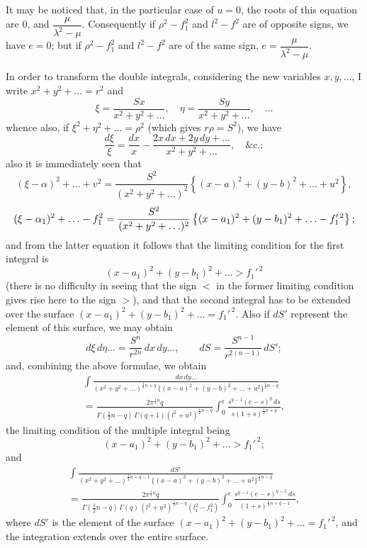 \documentclass[11pt,a4paper]{article}
\theoremstyle{plain}
\begin{document}
It may be noticed that, in the particular case of $u = 0$, the roots of this equation are $0$, and $\dfrac{\mu}{\lambda^2 - \mu}$. Consequently if $\rho^2 - f_1^2$ and $l^2 - f^2$ are of opposite signs, we have $e = 0$; but if $\rho^2 - f_1^2$ and $l^2 - f^2$ are of the same sign, $e = \dfrac{\mu}{\lambda^2 - \mu}$.

In order to transform the double integrals, considering the new variables $x, y, \ldots$, I write $x^2 + y^2 + \ldots = r^2$ and
\[\xi = \frac{S x}{x^2 + y^2 + \ldots}, \quad \eta = \frac{S y}{x^2 + y^2 + \ldots}, \quad \ldots\]
whence also, if $\xi^2 + \eta^2 + \ldots = \rho^2$ (which gives $r\rho = S^2$), we have
\[\frac{d\xi}{\xi} = \frac{dx}{x} - \frac{2x\,dx + 2y\,dy + \ldots}{x^2 + y^2 + \ldots}, \quad \&\text{c.};\]
also it is immediately seen that
\[(\xi - \alpha)^2 + \ldots + v^2 = \frac{S^2}{(x^2+y^2+\ldots)^2}\left\{(x-a)^2 + (y-b)^2 + \ldots + u^2\right\},\]
\[
\resizebox{\textwidth}{!}{$\displaystyle (\xi - \alpha_1)^2 + \ldots - f_1^2 = \frac{S^2}{(x^2+y^2+\ldots)^2}\left\{(x-a_1)^2 + (y-b_1)^2 + \ldots - f_1'^{\,2}\right\}; $}
\]
and from the latter equation it follows that the limiting condition for the first integral is
\[(x-a_1)^2 + (y-b_1)^2 + \ldots > f_1'^{\,2}\]
(there is no difficulty in seeing that the sign $<$ in the former limiting condition gives rise here to the sign $>$), and that the second integral has to be extended over the surface $(x-a_1)^2 + (y-b_1)^2 + \ldots = f_1'^{\,2}$. Also if $dS'$ represent the element of this surface, we may obtain
\[d\xi\,d\eta\ldots = \frac{S^n}{r^{2n}}\,dx\,dy\ldots, \qquad dS = \frac{S^{n-1}}{r^{2(n-1)}}\,dS';\]
and, combining the above formulae, we obtain
\begin{multline*}
\int \frac{dx\,dy\ldots}{(x^2+y^2+\ldots)^{\frac{1}{2}n+q}\,\{(x-a)^2 + (y-b)^2 + \ldots + u^2\}^{\frac{1}{2}n-q}}\\
= \frac{2\pi^{\frac{1}{2}n}q}{\Gamma(\tfrac{1}{2}n-q)\,\Gamma(q+1)(l^2+u^2)^{\frac{1}{2}n-q}} \int_0^{\epsilon} \frac{s^{q-1}(e-s)^q\,ds}{s(1+s)^{\frac{1}{2}n+q}},
\end{multline*}
the limiting condition of the multiple integral being
\[(x-a_1)^2 + (y-b_1)^2 + \ldots > f_1'^{\,2};\]
and
\begin{multline*}
\int \frac{dS'}{(x^2+y^2+\ldots)^{\frac{1}{2}n+q-1}\,\{(x-a)^2 + (y-b)^2 + \ldots + u^2\}^{\frac{1}{2}n-q}}\\
= \frac{2\pi^{\frac{1}{2}n}q}{\Gamma(\tfrac{1}{2}n-q)\,\Gamma(q)\,(l^2+u^2)^{\frac{1}{2}n-q}(l_1^2 - f_1^2)} \int_0^{\epsilon} \frac{s^{q-1}(e-s)^{q-1}\,ds}{(1+s)^{\frac{1}{2}n+q-1}},
\end{multline*}
where $dS'$ is the element of the surface $(x-a_1)^2 + (y-b_1)^2 + \ldots = f_1'^{\,2}$, and the integration extends over the entire surface.
\end{document}
